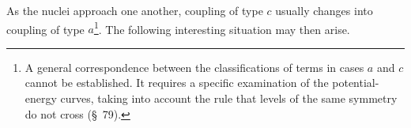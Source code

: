 As the nuclei approach one another, coupling of type $c$ usually changes into coupling of type $a$\footnote{A general correspondence between the classifications of terms in cases $a$ and $c$ cannot be established. It requires a specific examination of the potential-energy curves, taking into account the rule that levels of the same symmetry do not cross (\S~79).}. The following interesting situation may then arise.

